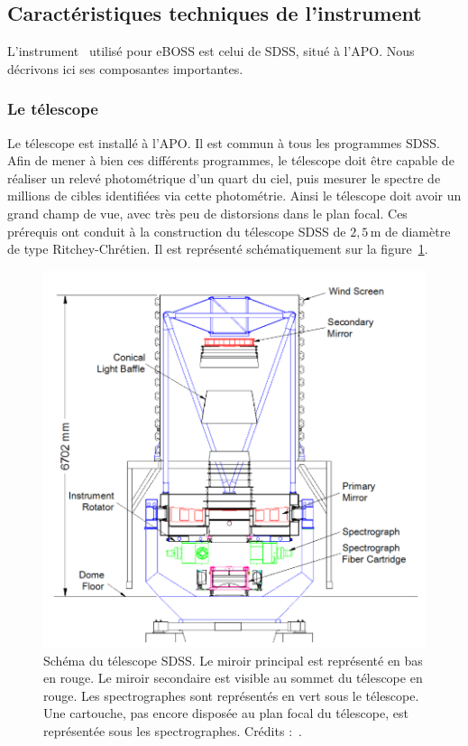 \documentclass[11pt, twoside, a4paper, openright]{report}
\begin{document}
\subsection{Caractéristiques techniques de l'instrument}
L'instrument~\cite{Gunn2006} utilisé pour eBOSS est celui de SDSS, situé à l'APO. Nous décrivons ici ses composantes importantes.

\subsubsection{Le télescope}
Le télescope est installé à l'APO. Il est commun à tous les programmes SDSS. Afin de mener à bien ces différents programmes, le télescope doit être capable de réaliser un relevé photométrique d'un quart du ciel, puis mesurer le spectre de millions de cibles identifiées via cette photométrie. Ainsi le télescope doit avoir un grand champ de vue, avec très peu de distorsions dans le plan focal. Ces prérequis ont conduit à la construction du télescope SDSS de $2,5\,\mathrm{m}$ de diamètre de type Ritchey-Chrétien. Il est représenté schématiquement sur la figure~\ref{fig:SchemaTelescope}. \\
\begin{figure}
  \centering
  \includegraphics[scale=0.5]{../img/eBOSS/SchemaTelescope}
  \caption{Schéma du télescope SDSS. Le miroir principal est représenté en bas en rouge. Le miroir secondaire est visible au sommet du télescope en rouge. Les spectrographes sont représentés en vert sous le télescope. Une cartouche, pas encore disposée au plan focal du télescope, est représentée sous les spectrographes. Crédits :~\cite{Smee2012}.}
  \label{fig:SchemaTelescope}
\end{figure}
\end{document}
